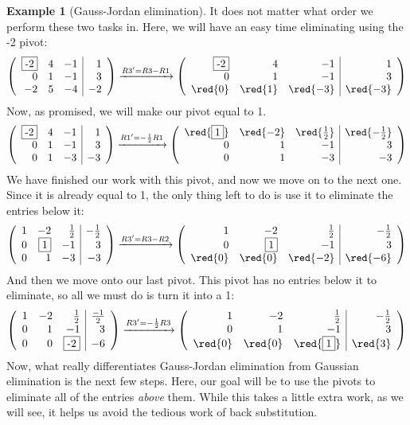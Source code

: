 \documentclass[
]{article}
\theoremstyle{definition}
\theoremstyle{definition}
\newtheorem{example}{Example}[section]
\theoremstyle{definition}
\theoremstyle{definition}
\theoremstyle{remark}
\begin{document}
\begin{example}[Gauss-Jordan elimination]
It does not matter what order we perform these two tasks in. Here, we will have an easy time eliminating using the -2 pivot:
\[\left(\begin{array}{rrr|r}\fbox{-2}&4&-1&1\\0&1&-1&3\\-2&5&-4&-2\end{array}\right)\xrightarrow{R3'=R3-R1} \left(\begin{array}{rrr|r}\fbox{-2}&4&-1&1\\0&1&-1&3\\\red{0}&\red{1}&\red{-3}&\red{-3}\end{array}\right)\]
Now, as promised, we will make our pivot equal to 1.
\[\left(\begin{array}{rrr|r}\fbox{-2}&4&-1&1\\0&1&-1&3\\0&1&-3&-3\end{array}\right) \xrightarrow{R1'=-\frac{1}{2} R1} \left(\begin{array}{rrr|r}\red{\fbox{1}}&\red{-2}&\red{\frac{1}{2}}&\red{-\frac{1}{2}}\\0&1&-1&3\\0&1&-3&-3\end{array}\right)\]
We have finished our work with this pivot, and now we move on to the next one. Since it is already equal to 1, the only thing left to do is use it to eliminate the entries below it:
\[\left(\begin{array}{rrr|r}1&-2&\frac{1}{2}&-\frac{1}{2}\\0&\fbox{1}&-1&3\\0&1&-3&-3\end{array}\right)\xrightarrow{R3'=R3-R2} \left(\begin{array}{rrr|r}1&-2&\frac{1}{2}&-\frac{1}{2}\\0&\fbox{1}&-1&3\\\red{0}&\red{0}&\red{-2}&\red{-6}\end{array}\right)\]
And then we move onto our last pivot. This pivot has no entries below it to eliminate, so all we must do is turn it into a 1:
\[\left(\begin{array}{rrr|r}1&-2&\frac{1}{2}&\frac{-1}{2}\\0&1&-1&3\\0&0&\fbox{-2}&-6\end{array}\right)\xrightarrow{R3'=-\frac{1}{2}R3}\left(\begin{array}{rrr|r}1&-2&\frac{1}{2}&-\frac{1}{2}\\0&1&-1&3\\\red{0}&\red{0}&\red{\fbox{1}}&\red{3}\end{array}\right) \]
Now, what really differentiates Gauss-Jordan elimination from Gaussian elimination is the next few steps. Here, our goal will be to use the pivots to eliminate all of the entries \emph{above} them. While this takes a little extra work, as we will see, it helps us avoid the tedious work of back substitution.


\end{example}
\end{document}
